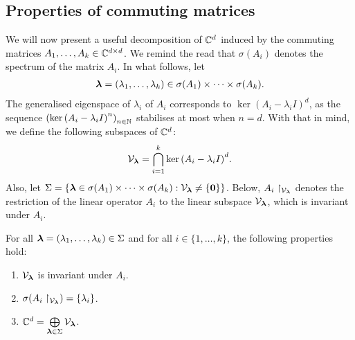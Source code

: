 \subsection{Properties of commuting matrices}

We will now present a useful decomposition of $\mathbb{C}^{d}$ induced by the commuting matrices $A_{1}, \ldots, A_{k} \in \mathbb{C}^{d \times d}$. We remind the read that $\sigma(A_{i})$ denotes the spectrum of the matrix $A_{i}$. In what follows, let
\begin{align*}
\boldsymbol{\lambda} = (\lambda_{1}, \ldots, \lambda_{k}) \in \sigma(A_{1}) \times \cdots \times \sigma(A_{k}) .
\end{align*}
The generalised eigenspace of $\lambda_{i}$ of $A_{i}$ corresponds to $\ker{(A_{i} - \lambda_{i} I)}^{d}$, as the sequence ${(\ker{(A_{i} - \lambda_{i} I)}^{n})}_{n \in \mathbb{N}}$ stabilises at most when $n=d$. With that in mind, we define the following subspaces of $\mathbb{C}^{d}$:
\begin{align*}
\mathcal{V}_{\boldsymbol{\lambda}} = \bigcap \limits_{i=1}^{k} \ker{(A_{i} - \lambda_{i} I)}^{d}.
\end{align*}
Also, let $\Sigma = \lbrace \boldsymbol{\lambda} \in \sigma(A_{1}) \times \cdots \times \sigma(A_{k}) : \mathcal{V}_{\boldsymbol{\lambda}} \neq \lbrace \boldsymbol{0} \rbrace \rbrace$.
Below, $A_{i} \restriction_{\mathcal{V}_{\boldsymbol{\lambda}}}$ denotes the restriction of the linear operator $A_{i}$ to the linear subspace $\mathcal{V}_{\boldsymbol{\lambda}}$, which is invariant under $A_{i}$.

\begin{theorem}
\label{subspace_decomposition}
For all $\boldsymbol{\lambda} = (\lambda_{1}, \ldots, \lambda_{k}) \in \Sigma$ and for all $i \in \lbrace 1, \ldots, k \rbrace$, the following properties hold:

\begin{enumerate}

\item $\mathcal{V}_{\boldsymbol{\lambda}}$ is invariant under $A_{i}$.

\item $\sigma(A_{i} \restriction_{\mathcal{V}_{\boldsymbol{\lambda}}}) = \lbrace \lambda_{i} \rbrace$.

\item $\mathbb{C}^{d} = \bigoplus \limits_{\boldsymbol{\lambda} \in \Sigma} \mathcal{V}_{\boldsymbol{\lambda}}$.

\end{enumerate}
\end{theorem}


